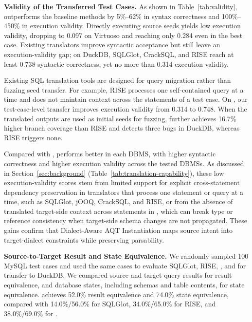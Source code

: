 \documentclass[conference]{IEEEtran}
\begin{document}
\textbf{Validity of the Transferred Test Cases.}
As shown in Table~\ref{tab:validity}, \tool{} outperforms the baseline methods by 5\%--62\% in syntax correctness and 100\%--450\% in execution validity.
Directly executing source seeds yields low execution validity, dropping to 0.097 on Virtuoso and reaching only 0.284 even in the best case.
Existing translators improve syntactic acceptance but still leave an execution-validity gap; on DuckDB, SQLGlot, CrackSQL, and RISE reach at least 0.738 syntactic correctness, yet no more than 0.314 execution validity.

Existing SQL translation tools are designed for query migration rather than fuzzing seed transfer. For example, RISE processes one self-contained query at a time and does not maintain context across the statements of a test case. On \duckdb{}, our test-case-level transfer improves execution validity from 0.314 to 0.748.
When the translated outputs are used as initial seeds for fuzzing, \tool{} further achieves 16.7\% higher branch coverage than RISE and detects three bugs in DuckDB, whereas RISE triggers none.

Compared with \sedar{}, \tool{} performs better in each DBMS, with \synatxratio{} higher syntactic correctness and \translateratio{} higher execution validity across the tested DBMSs.
As discussed in Section~\ref{sec:background} (Table~\ref{tab:translation-capability}), these low execution-validity scores stem from limited support for explicit cross-statement dependency preservation in translators that process one statement or query at a time, such as SQLGlot, jOOQ, CrackSQL, and RISE, or from the absence of translated target-side context across statements in \sedar{}, which can break type or reference consistency when target-side schema changes are not propagated.
These gains confirm that Dialect-Aware AQT Instantiation maps source intent into target-dialect constraints while preserving parsability.





\textbf{Source-to-Target Result and State Equivalence.}
We randomly sampled 100 MySQL test cases and used the same cases to evaluate SQLGlot, RISE, \sedar{}, and \tool{} for transfer to DuckDB.
We compared source and target query results for result equivalence, and database states, including schemas and table contents, for state equivalence.
\tool{} achieves 52.0\% result equivalence and 74.0\% state equivalence, compared with 14.0\%/56.0\% for SQLGlot, 34.0\%/65.0\% for RISE, and 38.0\%/69.0\% for \sedar{}.
\end{document}

